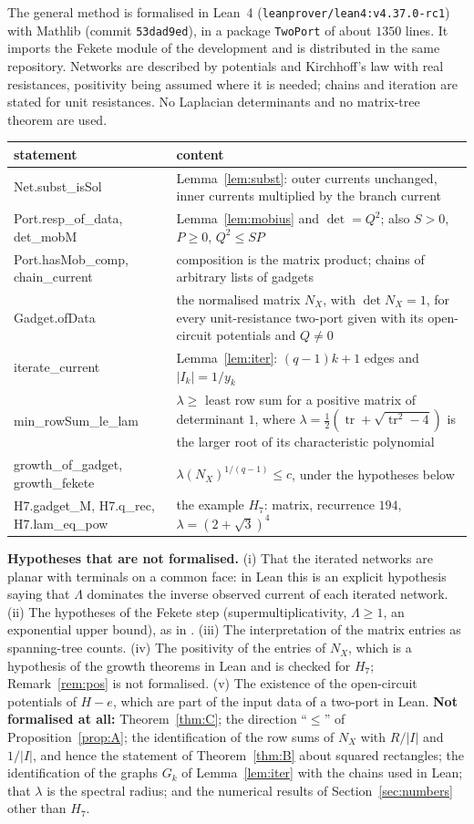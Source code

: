 \documentclass[11pt]{amsart}
\theoremstyle{plain}
\theoremstyle{definition}
\theoremstyle{remark}
\newcommand{\code}[1]{\texttt{#1}}
\newcommand{\Lam}{\Lambda}
\begin{document}
The general method is formalised in Lean~4 (\code{leanprover/lean4:v4.37.0-rc1}) with Mathlib (commit
\code{53dad9ed}), in a package \code{TwoPort} of about $1350$ lines. It imports the Fekete module of the
development \cite{M1} and is distributed in the same repository. Networks are described by potentials and
Kirchhoff's law with real resistances, positivity being assumed where it is needed; chains and iteration are
stated for unit resistances. No Laplacian determinants and no matrix-tree theorem are used.
\begin{center}
\small
\begin{tabularx}{\linewidth}{>{\ttfamily}l X}
\toprule
\textrm{statement}&content\\
\midrule
Net.subst\_isSol& Lemma~\ref{lem:subst}: outer currents unchanged, inner currents multiplied by the branch current\\
Port.resp\_of\_data, det\_mobM& Lemma~\ref{lem:mobius} and $\det=Q^2$; also $S>0$, $P\ge0$, $Q^2\le SP$\\
Port.hasMob\_comp, chain\_current& composition is the matrix product; chains of arbitrary lists of gadgets\\
Gadget.ofData& the normalised matrix $N_X$, with $\det N_X=1$, for every unit-resistance two-port given with its
open-circuit potentials and $Q\ne0$\\
iterate\_current& Lemma~\ref{lem:iter}: $(q-1)k+1$ edges and $|I_k|=1/y_k$\\
min\_rowSum\_le\_lam& $\lambda\ge$ least row sum for a positive matrix of determinant $1$, where
$\lambda=\tfrac12(\operatorname{tr}+\sqrt{\operatorname{tr}^2-4})$ is the larger root of its characteristic
polynomial\\
growth\_of\_gadget, growth\_fekete& $\lambda(N_X)^{1/(q-1)}\le c$, under the hypotheses below\\
H7.gadget\_M, H7.q\_rec, H7.lam\_eq\_pow& the example $H_7$: matrix, recurrence $194$, $\lambda=(2+\sqrt3)^4$\\
\bottomrule
\end{tabularx}
\end{center}
\textbf{Hypotheses that are not formalised.} (i) That the iterated networks are planar with terminals on a common
face: in Lean this is an explicit hypothesis saying that $\Lam$ dominates the inverse observed current of each
iterated network. (ii) The hypotheses of the Fekete step (supermultiplicativity, $\Lam\ge1$, an exponential upper
bound), as in \cite{M1}. (iii) The interpretation of the matrix entries as spanning-tree counts. (iv) The
positivity of the entries of $N_X$, which is a hypothesis of the growth theorems in Lean and is checked for $H_7$;
Remark~\ref{rem:pos} is not formalised. (v) The existence of the open-circuit potentials of $H-e$, which are part
of the input data of a two-port in Lean.
\textbf{Not formalised at all:} Theorem~\ref{thm:C}; the direction ``$\le$'' of Proposition~\ref{prop:A}; the
identification of the row sums of $N_X$ with $R/|I|$ and $1/|I|$, and hence the statement of
Theorem~\ref{thm:B} about squared rectangles; the identification of the graphs $G_k$ of Lemma~\ref{lem:iter} with
the chains used in Lean; that $\lambda$ is the spectral radius; and the numerical results of
Section~\ref{sec:numbers} other than $H_7$.
\end{document}
